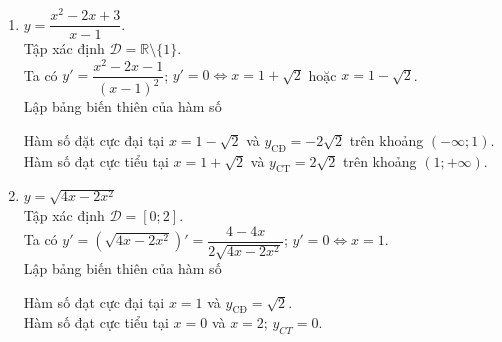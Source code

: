 \begin{bt}
{\begin{enumerate}
\begin{center}
			\end{center}
			Hàm số đạt cực tiểu tại $x=-\sqrt{2}$ và $x=\sqrt{2}$, $y_{CT}=-2$.\\
			Hàm số đạt cực đại tại $x=0$ và $y_{\text{CĐ}}=2$.
			\item $y=\dfrac{x^2-2x+3}{x-1}$.\\
			Tập xác định $\mathscr{D}=\mathbb{R}\setminus\{1\}$.\\
			Ta có $y'=\dfrac{x^2-2x-1}{(x-1)^2}$; $y'=0\Leftrightarrow x=1+\sqrt{2}$ hoặc $x=1-\sqrt{2}$.\\
			Lập bảng biến thiên của hàm số 
			\begin{center}
			\end{center}
			Hàm số đặt cực đại tại $x=1-\sqrt{2}$ và $y_{\text{CĐ}}=-2\sqrt{2}$ trên khoảng $(-\infty;1)$.\\
			Hàm số đạt cực tiểu tại $x=1+\sqrt{2}$ và $y_{\text{CT}}=2\sqrt{2}$ trên khoảng $(1;+\infty)$.
			\item $y=\sqrt{4x-2x^2}$\\
			Tập xác định $\mathscr{D}=[0;2]$.\\
			Ta có $y'=\left(\sqrt{4x-2x^2}\right)'=\dfrac{4-4x}{2\sqrt{4x-2x^2}}$; $y'=0\Leftrightarrow x=1$.\\
			Lập bảng biến thiên của hàm số
			\begin{center}
			\end{center}
			Hàm số đạt cực đại tại $x=1$ và $y_{\text{CĐ}}=\sqrt{2}$.\\
			Hàm số đạt cực tiểu tại $x=0$ và $x=2$; $y_{CT}=0$.
		\end{enumerate}
	}
\end{bt}

